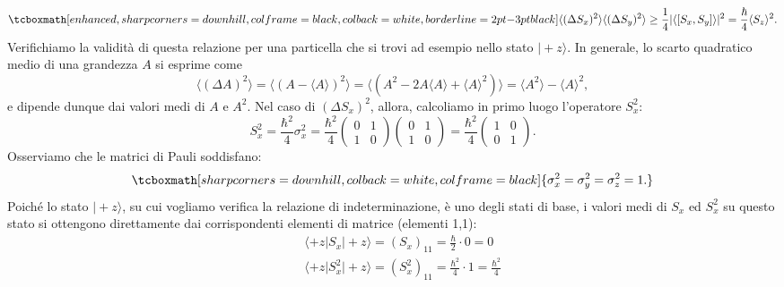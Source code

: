 	\begin{equation}
		\label{eq:cap4_6}
		\tcboxmath[enhanced, sharp corners=downhill, colframe=black, colback=white, borderline={2pt}{-3pt}{black}]{
			\langle (\Delta S_x) ^2 \rangle \langle (\Delta S_y) ^2 \rangle \geq \frac{1}{4} \vert \langle \left[ S_x , S_y \right] \rangle \vert ^2 = \frac{\hbar}{4} \langle S_z \rangle ^2 .
			}
	\end{equation}
Verifichiamo la validità di questa relazione per una particella che si trovi ad esempio nello stato $\vert +z\rangle$. In generale, lo scarto quadratico medio di una grandezza $A$ si esprime come
	\begin{equation}
		\langle (\Delta A ) ^2 \rangle = \langle (A- \langle A \rangle ) ^2 \rangle = \langle (A^2-2A\langle A \rangle + \langle A \rangle ^2) \rangle = \langle A^2\rangle - \langle A \rangle ^2,
	\end{equation}
e dipende dunque dai valori medi di $A$ e $A^2$. Nel caso di $(\Delta S_x) ^2$, allora, calcoliamo in primo luogo l'operatore $S_x ^2$:
	\begin{equation}
		S_x ^2 = \frac{\hbar ^2}{4} \sigma _x ^2=\frac{\hbar ^2}{4} \begin{pmatrix}
		0 & 1 \\
		1 & 0
		\end{pmatrix} \begin{pmatrix}
		0 & 1 \\
		1 & 0
		\end{pmatrix} = \frac{\hbar ^2}{4}\begin{pmatrix}
		1 & 0 \\
		0 & 1
		\end{pmatrix}.
	\end{equation}
Osserviamo che le matrici di Pauli soddisfano:
	\begin{equation}
		\tcboxmath[sharp corners=downhill, colback=white, colframe=black]{
		\sigma _x ^2 = \sigma _y ^2 = \sigma _z ^2 =1.
		}
	\end{equation}
Poiché lo stato $\vert +z \rangle$, su cui vogliamo verifica la relazione di indeterminazione, è uno degli stati di base, i valori medi di $S_x$ ed $S_x ^2$ su questo stato si ottengono direttamente dai corrispondenti elementi di matrice (elementi 1,1):
	\begin{eqnarray}
		& &\displaystyle{\langle +z \vert S_x \vert +z \rangle = (S_x)_{11} = \frac{\hbar}{2}\cdot 0 =0}  \\
		& &\displaystyle{\langle +z \vert S_x ^2\vert +z \rangle = (S_x ^2)_{11} = \frac{\hbar ^2}{4}\cdot 1 =\frac{\hbar ^2}{4}} 
	\end{eqnarray}
